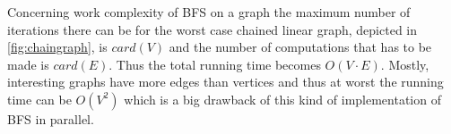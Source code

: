 Concerning work complexity of BFS on a graph the maximum number of iterations there can be for the worst case chained linear graph, depicted in \autoref{fig:chaingraph}, is $card(V)$ and the number of computations that has to be made is $card(E)$.
Thus the total running time becomes $O(V\cdot E)$.
Mostly, interesting graphs have more edges than vertices and thus at worst the running time can be $O(V^2)$ which is a big drawback of this kind of implementation of BFS in parallel.